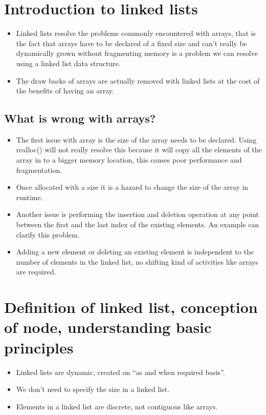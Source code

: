 \section{Introduction to linked lists}
\begin{itemize}
    \item Linked lists resolve the problems commonly encountered with arrays, that is the fact that arrays have to be declared of a fixed size and can't really be dynamically grown without fragmenting memory is a problem we can resolve using a linked list data structure.
    \item The draw backs of arrays are actually removed with linked lists at the cost of the benefits of having an array.
\end{itemize}

\subsection{What is wrong with arrays?}
\begin{itemize}
    \item The first issue with array is the size of the array needs to be declared. Using realloc() will not really resolve this because it will copy all the elements of the array in to a bigger memory location, this causes poor performance and fragmentation. 
    \item Once allocated with a size it is a hazard to change the size of the array in runtime.
    \item Another issue is performing the insertion and deletion operation at any point between the first and the last index of the existing elements. An example can clarify this problem.
        
    
    \item Adding a new element or deleting an existing element is independent to the number of elements in the linked list, no shifting kind of activities like arrays are required. 
\end{itemize}


\section{Definition of linked list, conception of node, understanding basic principles}
\begin{itemize}
    \item Linked lists are dynamic, created on ``as and when required basis''.
    \item We don't need to specify the size in a linked list.
    \item Elements in a linked list are discrete, not contiguous like arrays.
\end{itemize}

